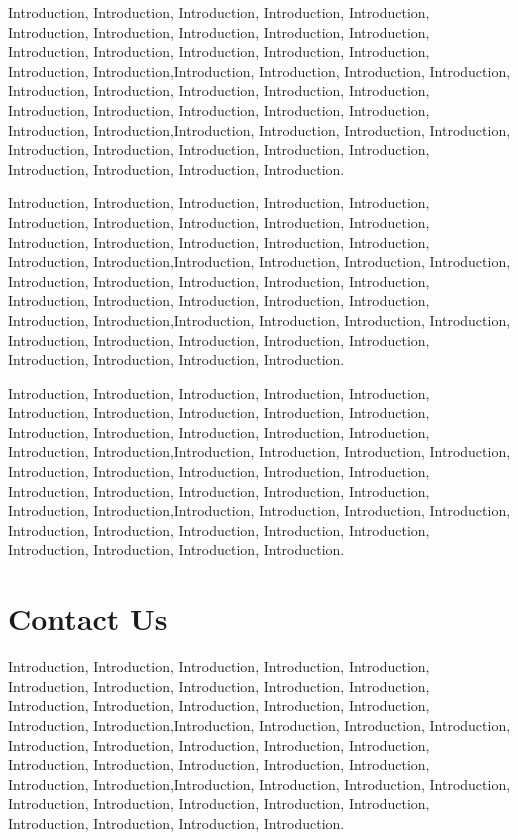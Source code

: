 Introduction, Introduction, Introduction, Introduction, Introduction, Introduction, Introduction, Introduction, Introduction, Introduction, Introduction, Introduction, Introduction, Introduction, Introduction, Introduction, Introduction,Introduction, Introduction, Introduction, Introduction, Introduction, Introduction, Introduction, Introduction, Introduction, Introduction, Introduction, Introduction, Introduction, Introduction, Introduction, Introduction,Introduction, Introduction, Introduction, Introduction, Introduction, Introduction, Introduction, Introduction, Introduction, Introduction, Introduction, Introduction, Introduction.

Introduction, Introduction, Introduction, Introduction, Introduction, Introduction, Introduction, Introduction, Introduction, Introduction, Introduction, Introduction, Introduction, Introduction, Introduction, Introduction, Introduction,Introduction, Introduction, Introduction, Introduction, Introduction, Introduction, Introduction, Introduction, Introduction, Introduction, Introduction, Introduction, Introduction, Introduction, Introduction, Introduction,Introduction, Introduction, Introduction, Introduction, Introduction, Introduction, Introduction, Introduction, Introduction, Introduction, Introduction, Introduction, Introduction.

Introduction, Introduction, Introduction, Introduction, Introduction, Introduction, Introduction, Introduction, Introduction, Introduction, Introduction, Introduction, Introduction, Introduction, Introduction, Introduction, Introduction,Introduction, Introduction, Introduction, Introduction, Introduction, Introduction, Introduction, Introduction, Introduction, Introduction, Introduction, Introduction, Introduction, Introduction, Introduction, Introduction,Introduction, Introduction, Introduction, Introduction, Introduction, Introduction, Introduction, Introduction, Introduction, Introduction, Introduction, Introduction, Introduction.

\section{Contact Us}

Introduction, Introduction, Introduction, Introduction, Introduction, Introduction, Introduction, Introduction, Introduction, Introduction, Introduction, Introduction, Introduction, Introduction, Introduction, Introduction, Introduction,Introduction, Introduction, Introduction, Introduction, Introduction, Introduction, Introduction, Introduction, Introduction, Introduction, Introduction, Introduction, Introduction, Introduction, Introduction, Introduction,Introduction, Introduction, Introduction, Introduction, Introduction, Introduction, Introduction, Introduction, Introduction, Introduction, Introduction, Introduction, Introduction.

